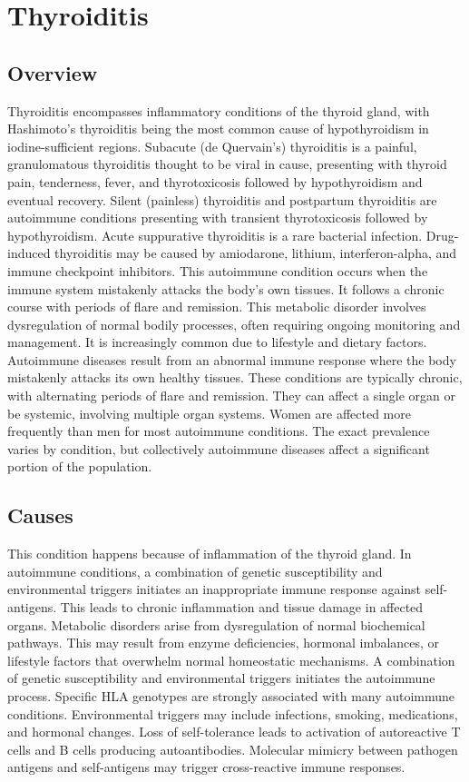 \chapter{Thyroiditis}
\label{sec:Thyroiditis}

\section{Overview}
Thyroiditis encompasses inflammatory conditions of the thyroid gland, with Hashimoto's thyroiditis being the most common cause of hypothyroidism in iodine-sufficient regions. Subacute (de Quervain's) thyroiditis is a painful, granulomatous thyroiditis thought to be viral in cause, presenting with thyroid pain, tenderness, fever, and thyrotoxicosis followed by hypothyroidism and eventual recovery. Silent (painless) thyroiditis and postpartum thyroiditis are autoimmune conditions presenting with transient thyrotoxicosis followed by hypothyroidism. Acute suppurative thyroiditis is a rare bacterial infection. Drug-induced thyroiditis may be caused by amiodarone, lithium, interferon-alpha, and immune checkpoint inhibitors. This autoimmune condition occurs when the immune system mistakenly attacks the body's own tissues. It follows a chronic course with periods of flare and remission. This metabolic disorder involves dysregulation of normal bodily processes, often requiring ongoing monitoring and management. It is increasingly common due to lifestyle and dietary factors. Autoimmune diseases result from an abnormal immune response where the body mistakenly attacks its own healthy tissues. These conditions are typically chronic, with alternating periods of flare and remission. They can affect a single organ or be systemic, involving multiple organ systems. Women are affected more frequently than men for most autoimmune conditions. The exact prevalence varies by condition, but collectively autoimmune diseases affect a significant portion of the population.
\section{Causes}
This condition happens because of inflammation of the thyroid gland. In autoimmune conditions, a combination of genetic susceptibility and environmental triggers initiates an inappropriate immune response against self-antigens. This leads to chronic inflammation and tissue damage in affected organs. Metabolic disorders arise from dysregulation of normal biochemical pathways. This may result from enzyme deficiencies, hormonal imbalances, or lifestyle factors that overwhelm normal homeostatic mechanisms. A combination of genetic susceptibility and environmental triggers initiates the autoimmune process. Specific HLA genotypes are strongly associated with many autoimmune conditions. Environmental triggers may include infections, smoking, medications, and hormonal changes. Loss of self-tolerance leads to activation of autoreactive T cells and B cells producing autoantibodies. Molecular mimicry between pathogen antigens and self-antigens may trigger cross-reactive immune responses.
